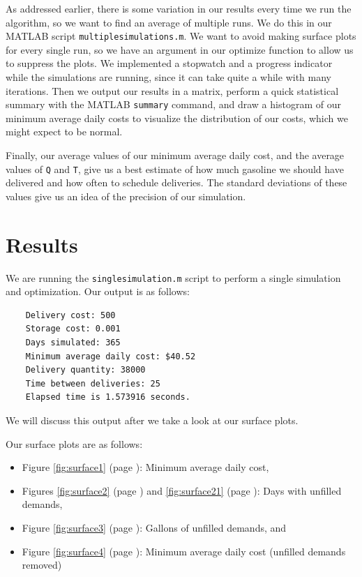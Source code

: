 \documentclass{article}
\begin{document}
    As addressed earlier, there is some variation in our results every time we run the algorithm, so we want to find an average of multiple runs. We do this in our MATLAB script \texttt{multiplesimulations.m}. We want to avoid making surface plots for every single run, so we have an argument in our optimize function to allow us to suppress the plots.  We implemented a stopwatch and a progress indicator while the simulations are running, since it can take quite a while with many iterations. Then we output our results in a matrix, perform a quick statistical summary with the MATLAB \texttt{summary} command, and draw a histogram of our minimum average daily costs to visualize the distribution of our costs, which we might expect to be normal.

    Finally, our average values of our minimum average daily cost, and the average values of \texttt{Q} and \texttt{T}, give us a best estimate of how much gasoline we should have delivered and how often to schedule deliveries. The standard deviations of these values give us an idea of the precision of our simulation.
    \section*{Results}
    We are running the \texttt{singlesimulation.m} script to perform a single simulation and optimization. Our output is as follows:

    \begin{verbatim}
    Delivery cost: 500
    Storage cost: 0.001
    Days simulated: 365
    Minimum average daily cost: $40.52
    Delivery quantity: 38000
    Time between deliveries: 25
    Elapsed time is 1.573916 seconds.\end{verbatim}

    We will discuss this output after we take a look at our surface plots.

    Our surface plots are as follows:
    \begin{itemize}
        \item Figure \ref{fig:surface1} (page \pageref{fig:surface1}): Minimum average daily cost,
        \item Figures \ref{fig:surface2} (page \pageref{fig:surface2}) and \ref{fig:surface21} (page \pageref{fig:surface21}): Days with unfilled demands,
        \item Figure \ref{fig:surface3} (page \pageref{fig:surface3}): Gallons of unfilled demands, and
        \item Figure \ref{fig:surface4} (page \pageref{fig:surface4}): Minimum average daily cost (unfilled demands removed)
    \end{itemize}
\end{document}
